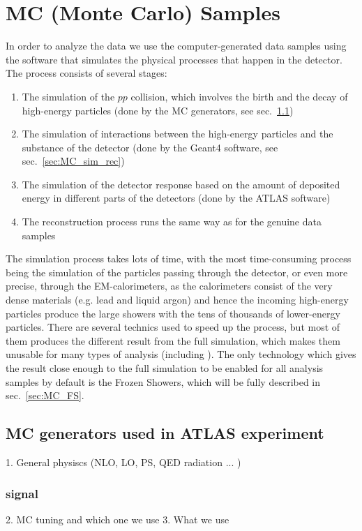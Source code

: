 \chapter{MC (Monte Carlo) Samples}
\label{sec:MCSamples}

In order to analyze the data we use the computer-generated data samples using the software that simulates the physical processes that happen in the detector. The process consists of several stages:
\begin{enumerate}
\item The simulation of the $pp$ collision, which involves the birth and the decay of high-energy particles (done by the MC generators, see sec.~\ref{sec:MC_gen})
\item The simulation of interactions between the high-energy particles and the substance of the detector (done by the Geant4 software, see sec.~\ref{sec:MC_sim_rec})
\item The simulation of the detector response based on the amount of deposited energy in different parts of the detectors (done by the ATLAS software)
\item The reconstruction process runs the same way as for the genuine data samples
\end{enumerate}
The simulation process takes lots of time, with the most time-consuming process being the simulation of the particles passing through the detector, or even more precise, through the EM-calorimeters, as the calorimeters consist of the very dense materials (e.g. lead and liquid argon) and hence the incoming high-energy particles produce the large showers with the tens of thousands of lower-energy particles. There are several technics used to speed up the process, but most of them produces the different result from the full simulation, which makes them unusable for many types of analysis (including \Zee). The only technology which gives the result close enough to the full simulation to be enabled for all analysis samples by default is the Frozen Showers, which will be fully described in sec.~\ref{sec:MC_FS}.

\section{MC generators used in ATLAS experiment}
\label{sec:MC_gen}

1. General physiscs (NLO, LO, PS, QED radiation ... ) 

\subsection{signal}
2. MC tuning and which one we use
3. What we use

